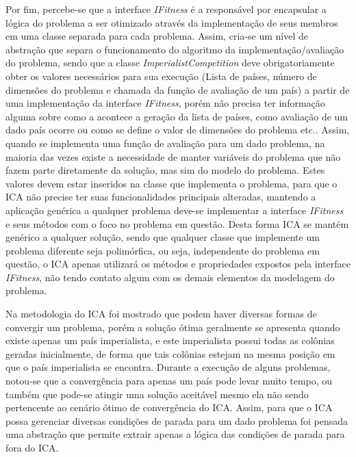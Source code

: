 Por fim, percebe-se que a interface \emph{IFitness} é a responsável por encapsular a lógica do problema a ser otimizado através da implementação de seus membros em uma classe separada para cada problema. Assim, cria-se um nível de abstração que separa o funcionamento do algoritmo da implementação/avaliação do problema, sendo que a classe \emph{ImperialistCompetition} deve obrigatoriamente obter os valores necessários para sua execução (Lista de países, número de dimensões do problema e chamada da função de avaliação de um país) a partir de uma implementação da interface \emph{IFitness}, porém não precisa ter informação alguma sobre como a acontece a geração da lista de países, como avaliação de um dado país ocorre ou como se define o valor de dimensões do problema etc.. Assim, quando se implementa uma função de avaliação para um dado problema, na maioria das vezes existe a necessidade de manter variáveis do problema que não fazem parte diretamente da solução, mas sim do modelo do problema. Estes valores devem estar inseridos na classe que implementa o problema, para que o ICA não precise ter suas funcionalidades principais alteradas, mantendo a aplicação genérica a qualquer problema deve-se implementar a interface \emph{IFitness} e seus métodos com o foco no problema em questão. Desta forma ICA se mantém genérico a qualquer solução, sendo que qualquer classe que implemente um problema diferente seja polimórfica, ou seja, independente do problema em questão, o ICA apenas utilizará os métodos e propriedades expostos pela interface \emph{IFitness}, não tendo contato algum com os demais elementos da modelagem do problema.

	Na metodologia do ICA foi mostrado que podem haver diversas formas de convergir um problema, porém a solução ótima geralmente se apresenta quando existe apenas um país imperialista, e este imperialista possui todas as colônias geradas inicialmente, de forma que tais colônias estejam na mesma posição em que o país imperialista se encontra. Durante a execução de alguns problemas, notou-se que a convergência para apenas um país pode levar muito tempo, ou também que pode-se atingir uma solução aceitável mesmo ela não sendo pertencente ao cenário ótimo de convergência do ICA. Assim, para que o ICA possa gerenciar diversas condições de parada para um dado problema foi pensada uma abstração que permite extrair apenas a lógica das condições de parada para fora do ICA.

